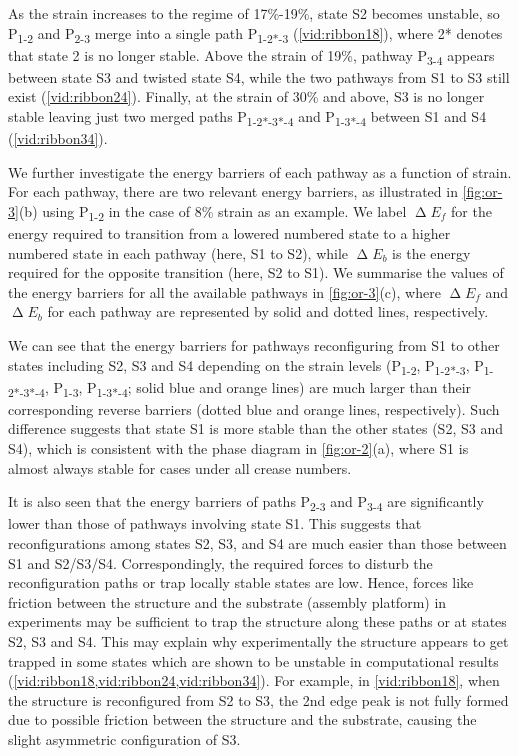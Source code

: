 As the strain increases to the regime of 17\%-19\%, state S2 becomes unstable, so P\textsubscript{1-2} and P\textsubscript{2-3} merge into a single path P\textsubscript{1-2*-3} (\cref{vid:ribbon18}), where 2* denotes that state 2 is no longer stable.
Above the strain of 19\%, pathway P\textsubscript{3-4} appears between state S3 and twisted state S4, while the two pathways from S1 to S3 still exist (\cref{vid:ribbon24}).
Finally, at the strain of 30\% and above, S3 is no longer stable leaving just two merged paths P\textsubscript{1-2*-3*-4} and P\textsubscript{1-3*-4} between S1 and S4 (\cref{vid:ribbon34}).

We further investigate the energy barriers of each pathway as a function of strain.
For each pathway, there are two relevant energy barriers, as illustrated in \cref{fig:or-3}(b) using P\textsubscript{1-2} in the case of 8\% strain as an example.
We label $\upDelta E_f$  for the energy required to transition from a lowered numbered state to a higher numbered state in each pathway (here, S1 to S2), while $\upDelta E_b$ is the energy required for the opposite transition (here, S2 to S1).
We summarise the values of the energy barriers for all the available pathways in \cref{fig:or-3}(c), where $\upDelta E_f$ and $\upDelta E_b$ for each pathway are represented by solid and dotted lines, respectively.

We can see that the energy barriers for pathways reconfiguring from S1 to other states including S2, S3 and S4 depending on the strain levels (P\textsubscript{1-2}, P\textsubscript{1-2*-3}, P\textsubscript{1-2*-3*-4}, P\textsubscript{1-3}, P\textsubscript{1-3*-4}; solid blue and orange lines) are much larger than their corresponding reverse barriers (dotted blue and orange lines, respectively).
Such difference suggests that state S1 is more stable than the other states (S2, S3 and S4), which is consistent with the phase diagram in \cref{fig:or-2}(a), where S1 is almost always stable for cases under all crease numbers.

It is also seen that the energy barriers of paths P\textsubscript{2-3} and P\textsubscript{3-4} are significantly lower than those of pathways involving state S1.
This suggests that reconfigurations among states S2, S3, and S4 are much easier than those between S1 and S2/S3/S4.
Correspondingly, the required forces to disturb the reconfiguration paths or trap locally stable states are low.
Hence, forces like friction between the structure and the substrate (assembly platform) in experiments may be sufficient to trap the structure along these paths or at states S2, S3 and S4.
This may explain why experimentally the structure appears to get trapped in some states which are shown to be unstable in computational results (\cref{vid:ribbon18,vid:ribbon24,vid:ribbon34}).
For example, in \cref{vid:ribbon18}, when the structure is reconfigured from S2 to S3, the 2nd edge peak is not fully formed due to possible friction between the structure and the substrate, causing the slight asymmetric configuration of S3.

